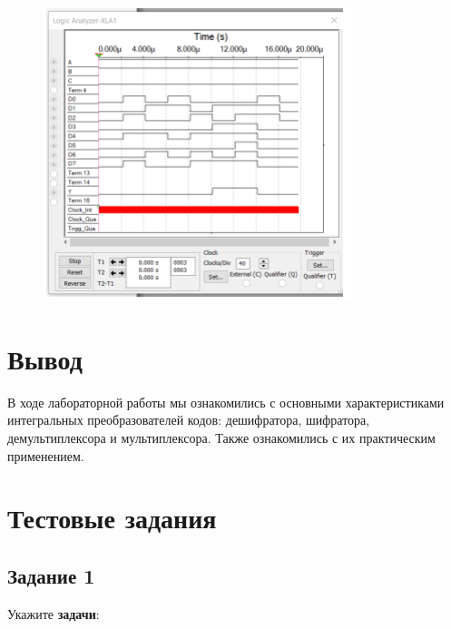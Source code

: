 \documentclass[bachelor, och, labwork]{shiza}
\begin{document}
\begin{figure}[H]
    \centering
    \includegraphics[width=0.8\textwidth]{pic2/6.png}
    \caption{}
\end{figure}


\section{Вывод}
В ходе лабораторной работы мы ознакомились с основными характеристиками
интегральных преобразователей кодов: дешифратора, шифратора, демультиплексора и 
мультиплексора. Также ознакомились с их практическим применением.


\section{Тестовые задания}

\subsection{Задание 1}
    Укажите \textbf{задачи}:
    
\end{document}
